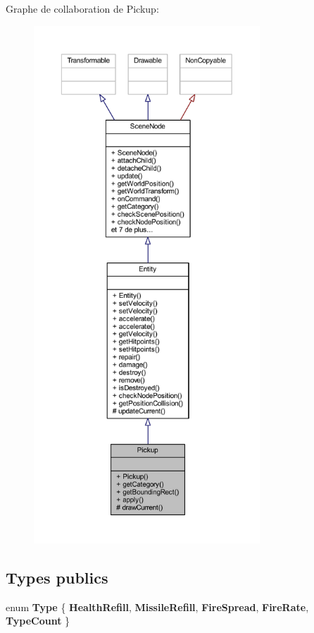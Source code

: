 Graphe de collaboration de Pickup\+:\nopagebreak
\begin{figure}[H]
\begin{center}
\leavevmode
\includegraphics[height=550pt]{class_pickup__coll__graph}
\end{center}
\end{figure}
\subsection*{Types publics}
\begin{DoxyCompactItemize}
\item 
\hypertarget{class_pickup_ad4681315b06f1fc58c8f2a17937dd88a}{}\label{class_pickup_ad4681315b06f1fc58c8f2a17937dd88a} 
enum {\bfseries Type} \{ \newline
{\bfseries Health\+Refill}, 
{\bfseries Missile\+Refill}, 
{\bfseries Fire\+Spread}, 
{\bfseries Fire\+Rate}, 
\newline
{\bfseries Type\+Count}
 \}
\end{DoxyCompactItemize}
